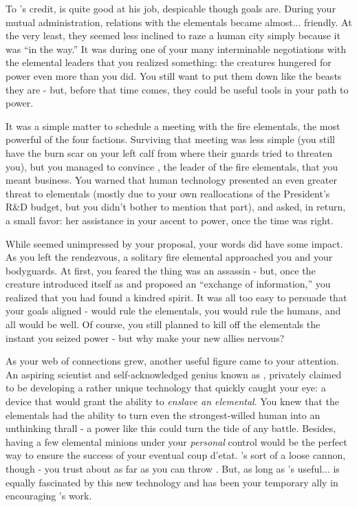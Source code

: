 \documentclass[char]{elementals}
\begin{document}
To \cLeader{}'s credit, \cLeader{\they} is quite good at his job, despicable though \cLeader{\their} goals are. During your mutual administration, relations with the elementals became almost... friendly. At the very least, they seemed less inclined to raze a human city simply because it was ``in the way.'' It was during one of your many interminable negotiations with the elemental leaders that you realized something: the creatures hungered for power even more than you did. You still want to put them down like the beasts they are - but, before that time comes, they could be useful tools in your path to power.

It was a simple matter to schedule a meeting with the fire elementals, the most powerful of the four factions. Surviving that meeting was less simple (you still have the burn scar on your left calf from where their guards tried to threaten you), but you managed to convince \cQueen{\intro}, the leader of the fire elementals, that you meant business. You warned \cQueen{\them} that human technology presented an even greater threat to elementals (mostly due to your own reallocations of the President's R\&D budget, but you didn't bother to mention that part), and asked, in return, a small favor: her assistance in your ascent to power, once the time was right.

While \cQueen{} seemed unimpressed by your proposal, your words did have some impact. As you left the rendezvous, a solitary fire elemental approached you and your bodyguards. At first, you feared the thing was an assassin - but, once the creature introduced itself as \cPyro{\intro} and proposed an ``exchange of information,'' you realized that you had found a kindred spirit. It was all too easy to persuade \cPyro{\them} that your goals aligned - \cPyro{\they} would rule the elementals, you would rule the humans, and all would be well. Of course, you still planned to kill off the elementals the instant you seized power - but why make your new allies nervous?

As your web of connections grew, another useful figure came to your attention. An aspiring scientist and self-acknowledged genius known as \cMS{\intro}, \cMS{\they} privately claimed to be developing a rather unique technology that quickly caught your eye: a device that would grant the ability to \emph{enslave an elemental}. You knew that the elementals had the ability to turn even the strongest-willed human into an unthinking thrall - a power like this could turn the tide of any battle. Besides, having a few elemental minions under your \emph{personal} control would be the perfect way to ensure the success of your eventual coup d'etat. \cMS{\They}'s sort of a loose cannon, though - you trust \cMS{\them} about as far as you can throw \cMS{\them}. But, as long as \cMS{\they}'s useful...  \cPyro{} is equally fascinated by this new technology and has been your temporary ally in encouraging \cMS{}'s work.  
\end{document}

